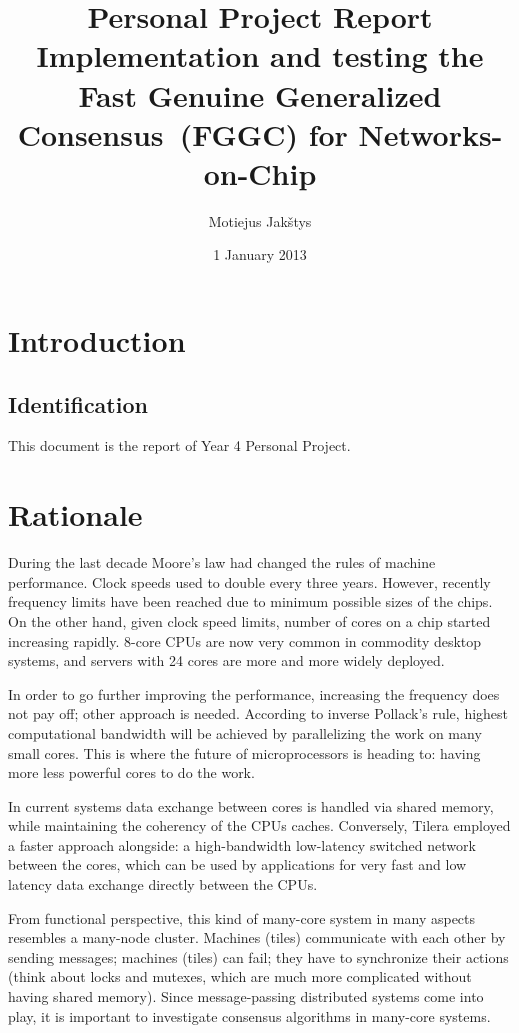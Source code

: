 \documentclass[english,11pt]{article}
\newcommand{\fggc}{Fast Genuine Generalized Consensus\ }
\begin{document}
\title{Personal Project Report\\
    Implementation and testing the \fggc (FGGC) for Networks-on-Chip}
\author{Motiejus Jakštys}
\date{1 January 2013}

\maketitle
\pagebreak
\tableofcontents
\pagebreak

\section{Introduction}
\subsection{Identification}

This document is the report of Year 4 Personal Project.

\section{Rationale}

During the last decade Moore's law had changed the rules of machine performance.
Clock speeds used to double every three years. However, recently frequency
limits have been reached due to minimum possible sizes of the chips. On the
other hand, given clock speed limits, number of cores on a chip started
increasing rapidly. 8-core CPUs are now very common in commodity desktop
systems, and servers with 24 cores are more and more widely deployed.

In order to go further improving the performance, increasing the frequency does
not pay off; other approach is needed. According to inverse Pollack's
rule\cite{pollack}, highest computational bandwidth will be achieved by
parallelizing the work on many small cores\cite{1kcorechips}. This is where the
future of microprocessors is heading to: having more less powerful cores to do
the work\cite{future-microprocessors}.

In current systems data exchange between cores is handled via shared memory,
while maintaining the coherency of the CPUs caches. Conversely, Tilera employed
a faster approach alongside: a high-bandwidth low-latency switched network
between the cores, which can be used by applications for very fast and low
latency data exchange directly between the CPUs\cite{tile64}.

From functional perspective, this kind of many-core system in many aspects
resembles a many-node cluster. Machines (tiles) communicate with each other by
sending messages; machines (tiles) can fail; they have to synchronize their
actions (think about locks and mutexes, which are much more complicated without
having shared memory). Since message-passing distributed systems come into play,
it is important to investigate consensus algorithms in many-core systems.
\end{document}
